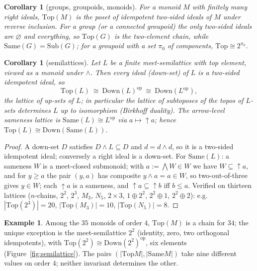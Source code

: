 \documentclass[11pt]{amsart}
\newtheorem{cor}[thm]{Corollary}
\theoremstyle{definition}
\newtheorem{ex}[thm]{Example}
\newcommand{\Same}{\mathrm{Same}}
\newcommand{\Sub}{\mathrm{Sub}}
\newcommand{\Top}{\mathrm{Top}}
\newcommand{\Down}{\mathrm{Down}}
\begin{document}
\begin{cor}[groups, groupoids, monoids]\label{cor:monoid}
For a monoid $M$ with finitely many right ideals, $\Top(M)$ is the poset of
idempotent two-sided ideals of $M$ under reverse inclusion. For a group (or a
connected groupoid) the only two-sided ideals are $\varnothing$ and everything,
so $\Top(G)$ is the two-element chain, while $\Same(G)=\Sub(G)$; for a
groupoid with a set $\pi_0$ of components, $\Top\cong 2^{\pi_0}$.
\end{cor}

\begin{cor}[semilattices]\label{cor:semilattice}
Let $L$ be a finite meet-semilattice with top element, viewed as a monoid under
$\wedge$. Then every ideal (down-set) of $L$ is a two-sided idempotent ideal, so
\[
\Top(L)\ \cong\ \Down(L)^{\mathrm{op}}\ \cong\ \Down(L^{\mathrm{op}}),
\]
the lattice of up-sets of $L$; in particular the lattice of subtoposes of the
topos of $L$-sets determines $L$ up to isomorphism (Birkhoff duality). The
arrow-level sameness lattice is $\Same(L)\cong L^{\mathrm{op}}$ via $a\mapsto
{\uparrow}a$; hence $\Top(L)\cong\Down(\Same(L))$.
\end{cor}
\begin{proof}
A down-set $D$ satisfies $D\wedge L\subseteq D$ and $d=d\wedge d$, so it is a
two-sided idempotent ideal; conversely a right ideal is a down-set. For
$\Same(L)$: a sameness $W$ is a meet-closed submonoid; with $a:=\bigwedge W\in W$
we have $W\subseteq{\uparrow}a$, and for $y\ge a$ the pair $(y,a)$ has
composite $y\wedge a=a\in W$, so two-out-of-three gives $y\in W$; each
${\uparrow}a$ is a sameness, and ${\uparrow}a\subseteq{\uparrow}b$ iff $b\le a$.
Verified on thirteen lattices ($n$-chains, $2^2$, $2^3$, $M_3$, $N_5$, $2\times3$,
$1\oplus2^2$, $2^2\oplus1$, $2^2\oplus2$): e.g.\ $|\Top(2^3)|=20$, $|\Top(M_3)|=10$,
$|\Top(N_5)|=8$.
\end{proof}

\begin{ex}
Among the $35$ monoids of order $4$, $\Top(M)$ is a chain for $34$; the unique
exception is the meet-semilattice $2^2$ (identity, zero, two orthogonal
idempotents), with $\Top(2^2)\cong\Down(2^2)^{\mathrm{op}}$, six elements
(Figure~\ref{fig:semilattice}). The pairs $(|\Top M|,|\Same M|)$ take nine
different values on order $4$; neither invariant determines the other.
\end{ex}
\end{document}
